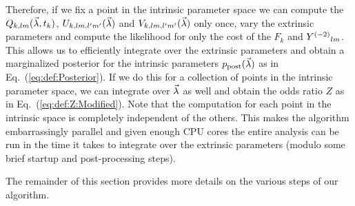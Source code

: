 Therefore, if we fix a point in the intrinsic parameter space we can compute the
$Q_{k,lm}(\vec{\lambda},t_k)$, $U_{k,lm,l'm'}(\vec{\lambda})$ and $V_{k,lm,l'm'}(\vec{\lambda})$ only once,
vary the extrinsic parameters and compute the likelihood for only the cost of the $F_k$ and $Y^{(-2)}{}_{lm}$.
This allows us to efficiently integrate over the extrinsic parameters and obtain a marginalized posterior 
for the intrinsic parameters $p_{\rm post}(\vec{\lambda})$ as in Eq.~(\ref{eq:def:Posterior}).
If we do this for a collection of points in the intrinsic parameter space, we can integrate over $\vec{\lambda}$ as
well and obtain the odds ratio $Z$ as in Eq.~(\ref{eq:def:Z:Modified}).
Note that the computation for each point in the intrinsic space is completely independent of the others.
This makes the algorithm embarrassingly parallel and given enough CPU cores the entire analysis can be
run in the time it takes to integrate over the extrinsic parameters (modulo some brief startup and post-processing steps).

The remainder of this section provides more details on the various steps of our algorithm.


  
